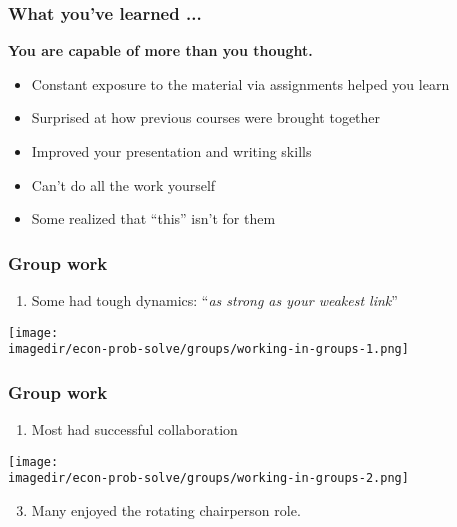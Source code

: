 \begin{frame}\frametitle{What you've learned ...}
	\begin{exampleblock}{}
		\begin{center}
			\textbf{\large You are capable of more than you thought.}
		\end{center}
	\end{exampleblock}
	\begin{itemize}
		\item	Constant exposure to the material via assignments helped you learn
		\item	Surprised at how previous courses were brought together
		\item	Improved your presentation and writing skills
		\item	Can't do all the work yourself
		\item	Some realized that ``this'' isn't for them
	\end{itemize}
\end{frame}

\begin{frame}\frametitle{Group work}
	\begin{enumerate}
		\item	Some had tough dynamics: ``\emph{as strong as your weakest link}''
	\end{enumerate}
	\begin{center}
		\texttt{[image: \\imagedir/econ-prob-solve/groups/working-in-groups-1.png]}
	\end{center}
\end{frame}

\begin{frame}\frametitle{Group work}
	\begin{enumerate}
		\item	Most had successful collaboration
	\end{enumerate}
	\begin{center}
		\texttt{[image: \\imagedir/econ-prob-solve/groups/working-in-groups-2.png]}
	\end{center}

	\begin{enumerate}
		\setcounter{enumi}{2}
		\item	Many enjoyed the rotating chairperson role.
	\end{enumerate}
\end{frame}

